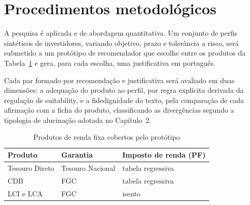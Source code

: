 
\section{Procedimentos metodológicos}

A pesquisa é aplicada e de abordagem quantitativa. Um conjunto de perfis
sintéticos de investidores, variando objetivo, prazo e tolerância a risco, será
submetido a um protótipo de recomendador que escolhe entre os produtos da
Tabela~\ref{tab:produtos} e gera, para cada escolha, uma justificativa em
português.

Cada par formado por recomendação e justificativa será avaliado em duas
dimensões: a adequação do produto ao perfil, por regra explícita derivada da
regulação de suitability, e a fidedignidade do texto, pela comparação de cada
afirmação com a ficha do produto, classificando as divergências segundo a
tipologia de alucinação adotada no Capítulo~2.

\begin{table}[htb]
  \caption{Produtos de renda fixa cobertos pelo protótipo}
  \label{tab:produtos}
  \centering
  \begin{tabular}{lll}
    \toprule
    \textbf{Produto} & \textbf{Garantia} & \textbf{Imposto de renda (PF)} \\
    \midrule
    Tesouro Direto & Tesouro Nacional & tabela regressiva \\
    CDB            & FGC              & tabela regressiva \\
    LCI e LCA      & FGC              & isento            \\
    \bottomrule
  \end{tabular}
\end{table}
